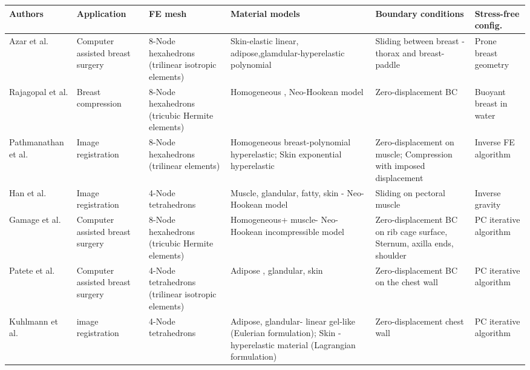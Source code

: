 
\begin{sidewaystable}[!h]
    \centering
    \small
   \begin{tabularx}{22cm}{|p{2.5cm}|p{2.5cm}|p{3.5cm}|X|p{3.5cm}|p{2.5cm}|}
   \hline
   Authors & Application & FE mesh & Material models & Boundary conditions & Stress-free config. \\
\hline
  Azar et al. \citep{azar_methods_2002} &  Computer assisted breast surgery & 8-Node hexahedrons (trilinear isotropic elements) & Skin-elastic linear, 
   adipose,glamdular-hyperelastic polynomial & Sliding between breast - thorax and breast-paddle & Prone breast geometry\\
   \hline
 Rajagopal et al.  \citep{rajagopal_modelling_2007} & Breast compression & 8-Node hexahedrons (tricubic Hermite elements)& Homogeneous , Neo-Hookean model& Zero-displacement BC & Buoyant breast in water \\
   \hline
  Pathmanathan et al. \citep{pathmanathan_predicting_2008}&Image registration & 8-Node hexahedrons (trilinear elements)& Homogeneous breast-polynomial hyperelastic; Skin exponential hyperelastic  & Zero-displacement on muscle; Compression with imposed displacement & Inverse FE algorithm \\
   \hline
  Han et al. \citep{han_nonlinear_2014}& Image registration& 4-Node tetrahedrons & Muscle, glandular, fatty, skin - Neo-Hookean model & Sliding on pectoral muscle & Inverse gravity \\
   \hline
 Gamage et al.  \citep{gamage_modelling_2012}&  Computer assisted breast surgery & 8-Node hexahedrons (tricubic Hermite elements) & Homogeneous+ muscle- Neo-Hookean incompressible model& Zero-displacement BC on rib cage surface, Sternum, axilla ends, shoulder & PC iterative algorithm \\
   \hline
 Patete et al.  \cite{patete_multi_2013}& Computer assisted breast surgery& 4-Node tetrahedrons (trilinear isotropic elements) & Adipose , glandular, skin & Zero-displacement BC on the  chest wall&PC iterative algorithm\\
   \hline
 Kuhlmann et al. \citep{kuhlmann_mechanical_2013}& image registration & 4-Node tetrahedrons & Adipose, glandular- linear gel-like (Eulerian formulation); Skin - hyperelastic material (Lagrangian formulation) & Zero-displacement chest wall& PC iterative algorithm\\
   \hline
   

\end{tabularx}
\end{sidewaystable}
